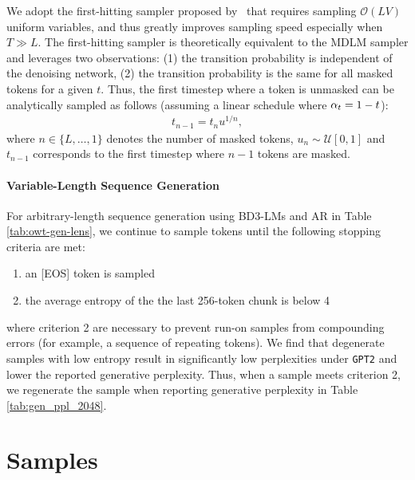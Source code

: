 \documentclass{article} %
\def\algos{BD3-LMs}
\begin{document}
   We adopt the first-hitting sampler proposed by~\citet{zheng2024masked} that requires sampling $\mathcal{O}(L V)$ uniform variables, and thus greatly improves sampling speed especially when $T \gg L$. The first-hitting sampler is theoretically equivalent to the MDLM sampler and leverages two observations: (1) the transition probability is independent of the denoising network, (2) the transition probability is the same for all masked tokens for a given $t$. Thus, the first timestep where a token is unmasked can be analytically sampled as follows (assuming a linear schedule where $\alpha_{t} = 1 - t$):
   \begin{align}
       t_{n-1} = t_n u^{1 / n},
   \end{align}
   \noindent where $n \in \{ L, \dots, 1\}$ denotes the number of masked tokens, $u_n \sim \mathcal{U}[0,1]$ and $t_{n-1}$ corresponds to the first timestep where $n-1$ tokens are masked.

    \paragraph{Variable-Length Sequence Generation}
    For arbitrary-length sequence generation using \algos{} and AR in Table \ref{tab:owt-gen-lens}, we continue to sample tokens until the following stopping criteria are met: 
    \begin{enumerate}
        \item an [EOS] token is sampled
        \item the average entropy of the the last 256-token chunk is below 4
    \end{enumerate}
    \noindent where criterion 2 are necessary to prevent run-on samples from compounding errors (for example, a sequence of repeating tokens). We find that degenerate samples with low entropy result in significantly low perplexities under \texttt{GPT2} and lower the reported generative perplexity. Thus, when a sample meets criterion 2, we regenerate the sample when reporting generative perplexity in Table \ref{tab:gen_ppl_2048}.
\section{Samples}\label{suppl:summaries}

\newpage

\newpage



% 
% 




\end{document}
